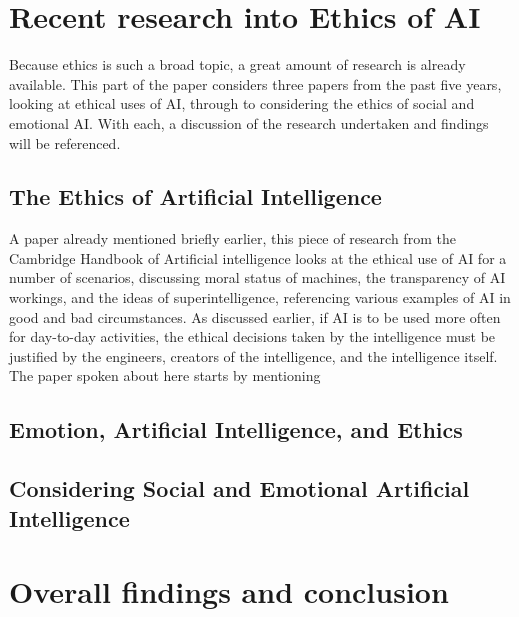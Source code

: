 \documentclass[article]{IEEEtran}
\begin{document}
\section{Recent research into Ethics of AI}
Because ethics is such a broad topic, a great amount of research is already available. This part of the paper considers three papers from the past five years, looking at ethical uses of AI, through to considering the ethics of social and emotional AI. With each, a discussion of the research undertaken and findings will be referenced.

\subsection{The Ethics of Artificial Intelligence}
A paper already mentioned briefly earlier, this piece of research from the Cambridge Handbook of Artificial intelligence \cite{ethics important} looks at the ethical use of AI for a number of scenarios, discussing moral status of machines, the transparency of AI workings, and the ideas of superintelligence, referencing various examples of AI in good and bad circumstances. 
As discussed earlier, if AI is to be used more often for day-to-day activities, the ethical decisions taken by the intelligence must be justified by the engineers, creators of the intelligence, and the intelligence itself. The paper spoken about here starts by mentioning 


\subsection{Emotion, Artificial Intelligence, and Ethics}

\subsection{Considering Social and Emotional Artificial Intelligence}

\section{Overall findings and conclusion}
\end{document}
